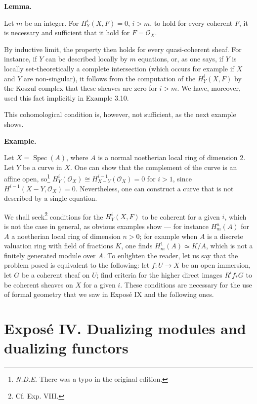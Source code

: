 \documentclass[
  11pt,
  a4paper,
]{book}
\begin{document}
\textbf{Lemma.}

Let \(m\) be an integer. For \(H^{i}_{Y}(X, F) = 0\), \(i > m\), to hold
for every coherent \(F\), it is necessary and sufficient that it hold
for \(F = \mathcal{O}_{X}\).

By inductive limit, the property then holds for every quasi-coherent
sheaf. For instance, if \(Y\) can be described locally by \(m\)
equations, or, as one says, if \(Y\) is locally set-theoretically a
complete intersection (which occurs for example if \(X\) and \(Y\) are
non-singular), it follows from the computation of the
\(H^{i}_{Y}(X, F)\) by the Koszul complex that these sheaves are zero
for \(i > m\). We have, moreover, used this fact implicitly in Example
3.10.

This cohomological condition is, however, not sufficient, as the next
example shows.

\textbf{Example.}

Let \(X = \operatorname{Spec}(A)\), where \(A\) is a normal noetherian
local ring of dimension 2. Let \(Y\) be a curve in \(X\). One can show
that the complement of the curve is an affine open, so\footnote{\emph{N.D.E.}
  There was a typo in the original edition.}
\(H^{i}_{Y}(\mathcal{O}_{X}) \cong
H^{i-1}_{X-Y}(\mathcal{O}_{X}) = 0\) for \(i > 1\), since
\(H^{i-1}(X - Y, \mathcal{O}_{X}) = 0\). Nevertheless, one can construct
a curve that is not described by a single equation.

We shall seek\footnote{Cf. Exp. VIII.} conditions for the
\(H^{i}_{Y}(X, F)\) to be coherent for a given \(i\), which is not the
case in general, as obvious examples show --- for instance
\(H^{n}_{m}(A)\) for \(A\) a noetherian local ring of dimension
\(n > 0\); for example when \(A\) is a discrete valuation ring with
field of fractions \(K\), one finds \(H^{1}_{m}(A) \simeq K/A\), which
is not a finitely generated module over \(A\). To enlighten the reader,
let us say that the problem posed is equivalent to the following: let
\(f: U \to X\) be an open immersion, let \(G\) be a coherent sheaf on
\(U\); find criteria for the higher direct images \(R^{i} f_{*} G\) to
be coherent sheaves on \(X\) for a given \(i\). These conditions are
necessary for the use of formal geometry that we saw in Exposé IX and
the following ones.

\chapter{Exposé IV. Dualizing modules and dualizing
functors}\label{exposuxe9-iv.-dualizing-modules-and-dualizing-functors}
\end{document}
